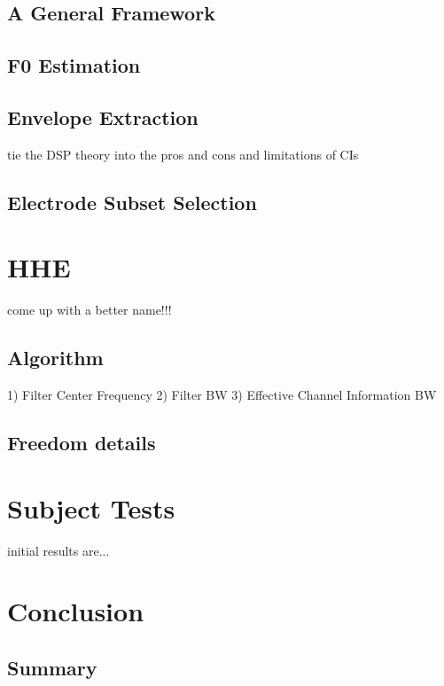 \documentclass [11pt, proquest] {uwthesis}[2015/03/03]
\begin{document}
\section{A General Framework}

\section{F0 Estimation}

\section{Envelope Extraction}
tie the DSP theory into the pros and cons and limitations of CIs

\section{Electrode Subset Selection}


\chapter{HHE}
come up with a better name!!!

\section{Algorithm}

1) Filter Center Frequency
2) Filter BW
3) Effective Channel Information BW

\section{Freedom details}


\chapter{Subject Tests}
initial results are...


\chapter{Conclusion}

\section{Summary}
\end{document}
